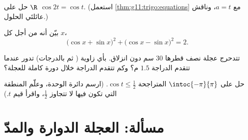 \begin{exercise}[$\star\star$]\label{exo:g11:trigo:8}
حل على $\R$  $\cos 2t = \cos t$. (استعمل
\cref{thm:g11:trigo:equations} مع $a = t$، وناقش عائلتَي
الحلول.)
\end{exercise}

\begin{exercise}[$\star\star$]\label{exo:g11:trigo:9}
بيّن أنه من أجل كل  $x$،
\[
\bigl(\cos x + \sin x\bigr)^2 + \bigl(\cos x - \sin x\bigr)^2 = 2 .
\]
\end{exercise}

\begin{exercise}[$\star\star$]\label{exo:g11:trigo:10}
تتدحرج عجلة نصف قطرها $30$ سم دون انزلاق. بأي زاوية (
ثم بالدرجات) تدور عندما تتقدم الدراجة $1.5$ م؟
وكم تتقدم الدراجة خلال دورة كاملة للعجلة؟
\end{exercise}

\begin{exercise}[$\star\star\star$]\label{exo:g11:trigo:11}
حل على $\intoc{-\pi}{\pi}$ المتراجحة
$\cos t \leq \frac12$. (ارسم دائرة الوحدة، وعلّم المنطقة التي تكون فيها
 لا تتجاوز $\frac12$، واقرأ  قيم
$t$.)
\end{exercise}

\section{مسألة: العجلة الدوارة والمدّ}

